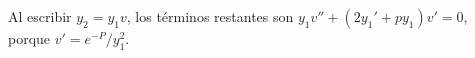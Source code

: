 Al escribir \(y_2=y_1v\), los términos restantes son
\(y_1v''+(2y_1'+py_1)v'=0\), porque \(v'=e^{-P}/y_1^2\).

